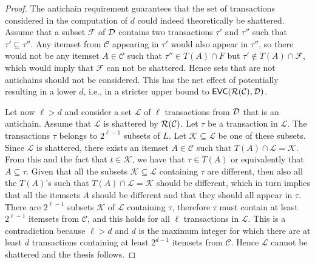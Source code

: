 \begin{proof}
  The antichain requirement guarantees that the set of transactions considered in
  the computation of $d$ could indeed theoretically be shattered. Assume that a
  subset $\mathcal{F}$ of ${\cal D}$ contains two transactions $\tau'$ and $\tau''$
  such that $\tau'\subseteq\tau''$. Any itemset from $\mathcal{C}$
  appearing in $\tau'$ would also appear in $\tau''$, so there would not be any
  itemset $A\in\mathcal{C}$ such that $\tau''\in T(A)\cap F$ but
  $\tau'\not\in T(A)\cap \mathcal{F}$, which would imply that $\mathcal{F}$ can
  not be shattered. Hence sets that are not antichains should not be
  considered. This has the net effect of potentially resulting in a lower $d$,
  i.e., in a stricter upper bound to $\mathsf{EVC}(\mathcal{R}(\mathcal{C}),{\cal D})$.

  Let now $\ell>d$ and consider a set $\mathcal{L}$ of $\ell$ transactions from
  ${\cal D}$ that is an antichain. Assume that $\mathcal{L}$ is shattered by
  $\mathcal{R}(\mathcal{C})$. Let $\tau$ be a transaction in $\mathcal{L}$.
  The transactions $\tau$ belongs to $2^{\ell-1}$ subsets of $L$. Let
  $\mathcal{K}\subseteq \mathcal{L}$ be one of these subsets. Since
  $\mathcal{L}$ is shattered, there exists an itemset $A\in\mathcal{C}$ such
  that $T(A)\cap \mathcal{L}=\mathcal{K}$. From this and the fact
  that $t\in \mathcal{K}$, we have that $\tau\in T(A)$ or equivalently that
  $A\subseteq\tau$. Given that all the subsets $\mathcal{K}\subseteq\mathcal{L}$
  containing $\tau$ are different, then also all the $T(A)$'s such that
  $T(A)\cap \mathcal{L}=\mathcal{K}$ should be
  different, which in turn implies that all the itemsets
  $A$ should be different and that they should all appear in $\tau$. There are
  $2^{\ell-1}$ subsets $\mathcal{K}$ of $\mathcal{L}$ containing $\tau$,
  therefore $\tau$ must contain at least $2^{\ell-1}$ itemsets from
  $\mathcal{C}$, and this holds for all $\ell$ transactions in $\mathcal{L}$. This is a
  contradiction because $\ell>d$ and $d$ is the
  maximum integer for which there are at least $d$ transactions containing at
  least $2^{d-1}$ itemsets from $\mathcal{C}$. Hence $\mathcal{L}$ cannot be shattered and
  the thesis follows.
\end{proof}

